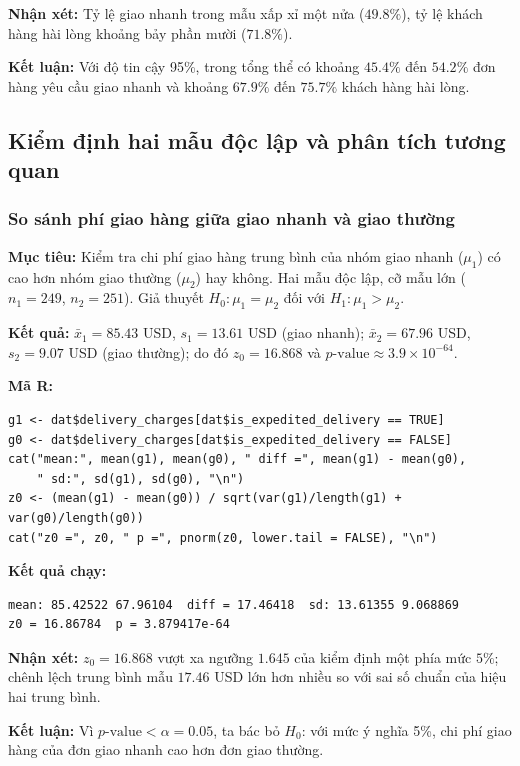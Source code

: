 \textbf{Nhận xét:} Tỷ lệ giao nhanh trong mẫu xấp xỉ một nửa ($49.8\%$), tỷ lệ khách hàng hài lòng khoảng bảy phần mười ($71.8\%$).

\textbf{Kết luận:} Với độ tin cậy 95\%, trong tổng thể có khoảng $45.4\%$ đến $54.2\%$ đơn hàng yêu cầu giao nhanh và khoảng $67.9\%$ đến $75.7\%$ khách hàng hài lòng.

\subsection{Kiểm định hai mẫu độc lập và phân tích tương quan}

\subsubsection{So sánh phí giao hàng giữa giao nhanh và giao thường}
\textbf{Mục tiêu:} Kiểm tra chi phí giao hàng trung bình của nhóm giao nhanh ($\mu_1$) có cao hơn nhóm giao thường ($\mu_2$) hay không. Hai mẫu độc lập, cỡ mẫu lớn ($n_1 = 249$, $n_2 = 251$). Giả thuyết $H_0: \mu_1 = \mu_2$ đối với $H_1: \mu_1 > \mu_2$.

\textbf{Kết quả:} $\bar{x}_1 = 85.43$ USD, $s_1 = 13.61$ USD (giao nhanh); $\bar{x}_2 = 67.96$ USD, $s_2 = 9.07$ USD (giao thường); do đó $z_0 = 16.868$ và $p\text{-value} \approx 3.9 \times 10^{-64}$.

\textbf{Mã R:}
\begin{lstlisting}
g1 <- dat$delivery_charges[dat$is_expedited_delivery == TRUE]
g0 <- dat$delivery_charges[dat$is_expedited_delivery == FALSE]
cat("mean:", mean(g1), mean(g0), " diff =", mean(g1) - mean(g0),
    " sd:", sd(g1), sd(g0), "\n")
z0 <- (mean(g1) - mean(g0)) / sqrt(var(g1)/length(g1) + var(g0)/length(g0)) 
cat("z0 =", z0, " p =", pnorm(z0, lower.tail = FALSE), "\n")
\end{lstlisting}
\textbf{Kết quả chạy:}
\begin{lstlisting}[style=rout]
mean: 85.42522 67.96104  diff = 17.46418  sd: 13.61355 9.068869 
z0 = 16.86784  p = 3.879417e-64 
\end{lstlisting}

\textbf{Nhận xét:} $z_0 = 16.868$ vượt xa ngưỡng $1.645$ của kiểm định một phía mức $5\%$; chênh lệch trung bình mẫu $17.46$ USD lớn hơn nhiều so với sai số chuẩn của hiệu hai trung bình.

\textbf{Kết luận:} Vì $p\text{-value} < \alpha = 0.05$, ta bác bỏ $H_0$: với mức ý nghĩa 5\%, chi phí giao hàng của đơn giao nhanh cao hơn đơn giao thường.

